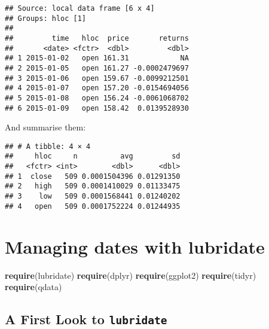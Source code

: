\documentclass[]{book}
\newenvironment{Shaded}{\begin{snugshade}}{\end{snugshade}}
\newcommand{\KeywordTok}[1]{\textcolor[rgb]{0.13,0.29,0.53}{\textbf{{#1}}}}
\newcommand{\DataTypeTok}[1]{\textcolor[rgb]{0.13,0.29,0.53}{{#1}}}
\newcommand{\StringTok}[1]{\textcolor[rgb]{0.31,0.60,0.02}{{#1}}}
\newcommand{\OtherTok}[1]{\textcolor[rgb]{0.56,0.35,0.01}{{#1}}}
\newcommand{\NormalTok}[1]{{#1}}
\begin{document}
\begin{verbatim}
## Source: local data frame [6 x 4]
## Groups: hloc [1]
## 
##         time   hloc  price       returns
##       <date> <fctr>  <dbl>         <dbl>
## 1 2015-01-02   open 161.31            NA
## 2 2015-01-05   open 161.27 -0.0002479697
## 3 2015-01-06   open 159.67 -0.0099212501
## 4 2015-01-07   open 157.20 -0.0154694056
## 5 2015-01-08   open 156.24 -0.0061068702
## 6 2015-01-09   open 158.42  0.0139528930
\end{verbatim}

And summarise them:

\begin{Shaded}
\end{Shaded}

\begin{verbatim}
## # A tibble: 4 × 4
##     hloc     n          avg         sd
##   <fctr> <int>        <dbl>      <dbl>
## 1  close   509 0.0001504396 0.01291350
## 2   high   509 0.0001410029 0.01133475
## 3    low   509 0.0001568441 0.01240202
## 4   open   509 0.0001752224 0.01244935
\end{verbatim}

\chapter{Managing dates with
lubridate}\label{managing-dates-with-lubridate}

\begin{Shaded}
\begin{Highlighting}[]
\KeywordTok{require}\NormalTok{(lubridate)}
\KeywordTok{require}\NormalTok{(dplyr)}
\KeywordTok{require}\NormalTok{(ggplot2)}
\KeywordTok{require}\NormalTok{(tidyr)}
\KeywordTok{require}\NormalTok{(qdata)}
\end{Highlighting}
\end{Shaded}

\section{\texorpdfstring{A First Look to
\texttt{lubridate}}{A First Look to lubridate}}\label{a-first-look-to-lubridate}
\end{document}
